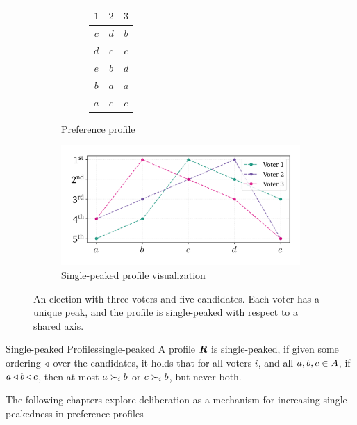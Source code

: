 \begin{figure}[ht]
	\centering
	\begin{subfigure}[b]{0.3\textwidth}
		\centering
		\begin{subfigure}[b]{0.3\textwidth}
			\centering
			\begin{tabular}{ccc}
				\toprule
				$1$ & $2$ & $3$ \\
				\midrule
				$c$ & $d$ & $b$ \\
				$d$ & $c$ & $c$ \\
				$e$ & $b$ & $d$ \\
				$b$ & $a$ & $a$ \\
				$a$ & $e$ & $e$ \\
				\bottomrule
			\end{tabular}
			\vspace{2.8em}
		\end{subfigure}
		\caption{Preference profile}\label{tab:corresponding_profile}
	\end{subfigure}
	\hfill
	\begin{subfigure}[b]{0.65\textwidth}
		\centering
		\includegraphics[width=\textwidth]{Figures/single_peak_vis.png}
		\caption{Single-peaked profile visualization}\label{fig:singlepeaked_vis}
	\end{subfigure}
	\caption{An election with three voters and five candidates. Each voter has a unique peak, and the profile is single-peaked with respect to a shared axis.}
	\label{fig:singlepeaked_full}
\end{figure}
\begin{definition}{Single-peaked Profiles}{single-peaked}
	A profile $\boldsymbol{R}$ is single-peaked, if given some ordering
	$\triangleleft$ over the candidates, it holds that for all voters $i$, and
	all $a, b, c \in A$, if $a \triangleleft b \triangleleft c$, then
	at most $a \succ_i b$ or $c \succ_i b$, but never both.
\end{definition}

The following chapters explore deliberation as a mechanism for increasing
single-peakedness in preference profiles


